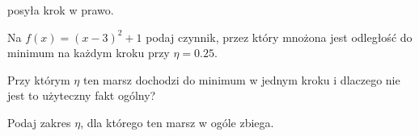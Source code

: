 \begin{testexercises}
{  posyła krok w prawo.}
\item Na $f(x) = (x-3)^{2} + 1$ podaj czynnik, przez który mnożona jest
  odległość do minimum na każdym kroku przy $\eta = \num{0.25}$.
\item Przy którym $\eta$ ten marsz dochodzi do minimum w jednym kroku i
  dlaczego nie jest to użyteczny fakt ogólny?
\item Podaj zakres $\eta$, dla którego ten marsz w ogóle zbiega.
\end{testexercises}

